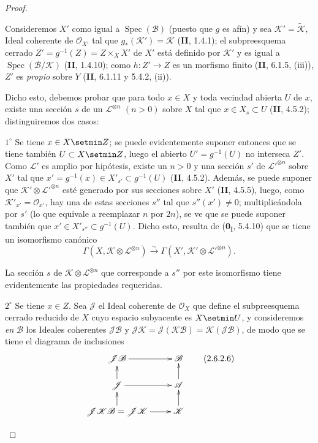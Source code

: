 \begin{proof}
\begin{env}[2.6.2.5]
\label{III.2.6.2.5-fr}
Consideremos $X'$ como igual a $\operatorname{Spec}(\mathcal B)$ (puesto que
$g$ es afín) y sea $\mathcal K'=\widetilde{\mathcal K}$, Ideal
coherente de $\mathcal O_{X'}$ tal que $g_*(\mathcal K')=\mathcal K$
(\textbf{II}, 1.4.1); el subpreesquema cerrado
$Z'=g^{-1}(Z)=Z\times_X X'$ de $X'$ está definido por $\mathcal K'$ y es igual
a $\operatorname{Spec}(\mathcal B/\mathcal K)$ (\textbf{II}, 1.4.10); como
$h:Z'\to Z$ es un morfismo finito (\textbf{II}, 6.1.5, (iii)), $Z'$ es \emph{propio}
sobre $Y$ (\textbf{II}, 6.1.11 y 5.4.2, (ii)).

Dicho esto, debemos probar que para todo $x\in X$ y toda vecindad
abierta $U$ de $x$, existe una sección $s$ de un
$\mathcal L^{\otimes n}$ $(n>0)$ sobre $X$ tal que
$x\in X_s\subset U$ (\textbf{II}, 4.5.2); distinguiremos dos casos:

$1^\circ$ Se tiene $x\in X\setmin Z$; se puede evidentemente suponer entonces que se tiene
también $U\subset X\setmin Z$, luego el abierto $U'=g^{-1}(U)$ no interseca
$Z'$. Como $\mathcal L'$ es amplio por hipótesis, existe un $n>0$ y
una sección $s'$ de $\mathcal L'^{\otimes n}$ sobre $X'$ tal
que $x'=g^{-1}(x)\in X'_{s'}\subset g^{-1}(U)$ (\textbf{II}, 4.5.2). Además, se
puede suponer que $\mathcal K'\otimes\mathcal L'^{\otimes n}$ esté
generado por sus secciones sobre $X'$ (\textbf{II}, 4.5.5), luego, como
$\mathcal K'_{x'}=\mathcal O_{x'}$, hay una de estas secciones $s''$
tal que $s''(x')\neq0$; multiplicándola por $s'$ (lo que equivale a
reemplazar $n$ por $2n$), se ve que se puede suponer también que
$x'\in X'_{s''}\subset g^{-1}(U)$. Dicho esto, resulta de
(\textbf{0}\textsubscript{I}, 5.4.10) que se tiene un isomorfismo canónico
\[
\Gamma(X,\mathcal K\otimes\mathcal L^{\otimes n})
\xrightarrow{\sim}
\Gamma(X',\mathcal K'\otimes\mathcal L'^{\otimes n}).
\]

La sección $s$ de $\mathcal K\otimes\mathcal L^{\otimes n}$ que
corresponde a $s''$ por este isomorfismo tiene evidentemente las propiedades
requeridas.

$2^\circ$ Se tiene $x\in Z$. Sea $\mathcal J$ el Ideal coherente de
$\mathcal O_X$ que define el subpreesquema cerrado reducido de $X$ cuyo
espacio subyacente es $X\setmin U$, y consideremos \emph{en} $\mathcal B$ los Ideales
coherentes $\mathcal J\mathcal B$ y
$\mathcal J\mathcal K=\mathcal J(\mathcal K\mathcal B)
=\mathcal K(\mathcal J\mathcal B)$, de modo que se tiene el diagrama
de inclusiones
\[
\xymatrix@R=1.5em{
\mathcal J\mathcal B\ar[r] & \mathcal B\\
\mathcal J\ar[r]\ar[u] &
\mathcal A\ar[u]\\
\mathcal J\mathcal K\mathcal B=\mathcal J\mathcal K
\ar[r]\ar[u] &
\mathcal K\ar[u]
}
\tag{2.6.2.6}\label{III.2.6.2.6-fr}
\]


\end{env}
\end{proof}
